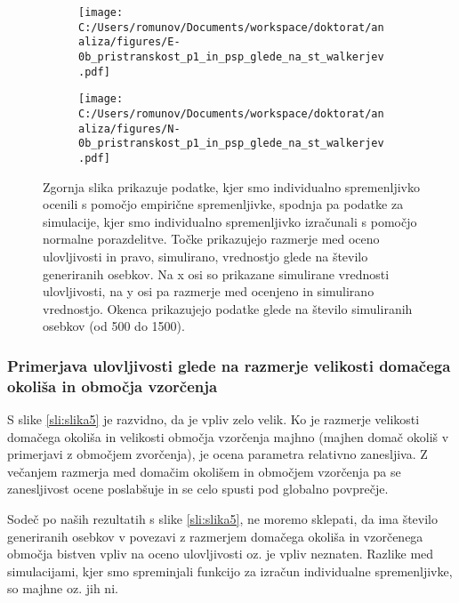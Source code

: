 \begin{figure}[H]
\centering
\begin{subfigure}[b]{1\textwidth}
  \centering
  \texttt{[image: C:/Users/romunov/Documents/workspace/doktorat/analiza/figures/E-0b\_pristranskost\_p1\_in\_psp\_glede\_na\_st\_walkerjev.pdf]}

  \label{sli:sub4.1}
\end{subfigure}

\begin{subfigure}[b]{1\textwidth}
  \centering
  \texttt{[image: C:/Users/romunov/Documents/workspace/doktorat/analiza/figures/N-0b\_pristranskost\_p1\_in\_psp\_glede\_na\_st\_walkerjev.pdf]}
  \label{sli:sub4.2}
\end{subfigure}

\caption[Primerjava ocenjene ulovljivosti s simulirano glede na število simuliranih osebkov]{Zgornja slika prikazuje podatke, kjer smo individualno spremenljivko ocenili s pomočjo empirične spremenljivke, spodnja pa podatke za simulacije, kjer smo individualno spremenljivko izračunali s pomočjo normalne porazdelitve. Točke prikazujejo razmerje med oceno ulovljivosti in pravo, simulirano, vrednostjo glede na število generiranih osebkov. Na x osi so prikazane simulirane vrednosti ulovljivosti, na y osi pa razmerje med ocenjeno in simulirano vrednostjo. Okenca prikazujejo podatke glede na število simuliranih osebkov (od 500 do 1500).}
\label{sli:slika4}
\end{figure}

\subsubsection{Primerjava ulovljivosti glede na razmerje velikosti domačega okoliša in območja vzorčenja}
S slike \ref{sli:slika5} je razvidno, da je vpliv zelo velik. Ko je razmerje velikosti domačega okoliša in velikosti območja vzorčenja majhno (majhen domač okoliš v primerjavi z območjem zvorčenja), je ocena parametra relativno zanesljiva. Z večanjem razmerja med domačim okolišem in območjem vzorčenja pa se zanesljivost ocene poslabšuje in se celo spusti pod globalno povprečje.

Sodeč po naših rezultatih s slike \ref{sli:slika5}, ne moremo sklepati, da ima število generiranih osebkov v povezavi z razmerjem domačega okoliša in vzorčenega območja bistven vpliv na oceno ulovljivosti oz. je vpliv neznaten. Razlike med simulacijami, kjer smo spreminjali funkcijo za izračun individualne spremenljivke, so majhne oz. jih ni.

